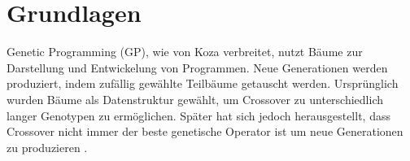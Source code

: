 


\newtheorem{myclaim}[claims]{Scientific Claim}
\newtheorem{hypothesis}[hypothesises]{Hypothesis}

\chapter{Grundlagen}
\label{cha:grundlagen}


Genetic Programming (GP), wie von Koza 
verbreitet, nutzt Bäume zur Darstellung und Entwickelung von Programmen. Neue Generationen werden produziert, indem zufällig gewählte Teilbäume getauscht werden. Ursprünglich wurden Bäume als Datenstruktur gewählt, um Crossover zu unterschiedlich langer Genotypen zu ermöglichen. Später hat sich jedoch herausgestellt, dass Crossover nicht immer der beste genetische Operator ist um neue Generationen zu produzieren
.

